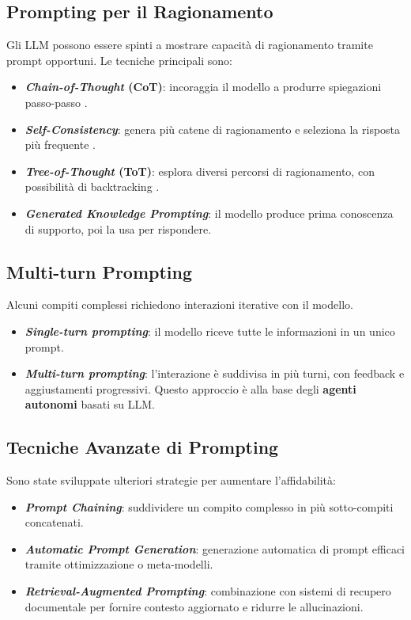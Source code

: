 \subsection{Prompting per il Ragionamento}
Gli LLM possono essere spinti a mostrare capacità di ragionamento tramite prompt opportuni.
Le tecniche principali sono:
\begin{itemize}
    \item \textbf{\textit{Chain-of-Thought} (CoT)}: incoraggia il modello a produrre spiegazioni passo-passo \cite{wei2022chain}.
    \item \textbf{\textit{Self-Consistency}}: genera più catene di ragionamento e seleziona la risposta più frequente \cite{wang2022selfconsistency}.
    \item \textbf{\textit{Tree-of-Thought} (ToT)}: esplora diversi percorsi di ragionamento, con possibilità di backtracking \cite{yao2023tree}.
    \item \textbf{\textit{Generated Knowledge Prompting}}: il modello produce prima conoscenza di supporto, poi la usa per rispondere.
\end{itemize}

\subsection{Multi-turn Prompting}
Alcuni compiti complessi richiedono interazioni iterative con il modello.
\begin{itemize}
    \item \textbf{\textit{Single-turn prompting}}: il modello riceve tutte le informazioni in un unico prompt.
    \item \textbf{\textit{Multi-turn prompting}}: l'interazione è suddivisa in più turni, 
    con feedback e aggiustamenti progressivi. Questo approccio è alla base degli \textbf{agenti autonomi} basati su LLM.
\end{itemize}

\subsection{Tecniche Avanzate di Prompting}
Sono state sviluppate ulteriori strategie per aumentare l'affidabilità:
\begin{itemize}
    \item \textbf{\textit{Prompt Chaining}}: suddividere un compito complesso in più sotto-compiti concatenati.
    \item \textbf{\textit{Automatic Prompt Generation}}: generazione automatica di prompt efficaci 
    tramite ottimizzazione o meta-modelli.
    \item \textbf{\textit{Retrieval-Augmented Prompting}}: combinazione con sistemi di recupero documentale 
    per fornire contesto aggiornato e ridurre le allucinazioni.
\end{itemize}

